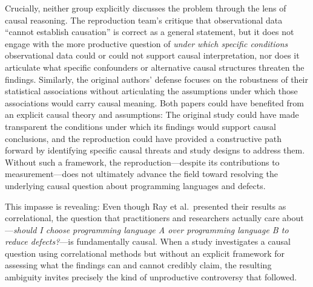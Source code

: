 Crucially, neither group explicitly discusses the problem through the lens of causal reasoning.
The reproduction team's critique that observational data ``cannot establish causation'' is correct as a general statement, but it does not engage with the more productive question of \emph{under which specific conditions} observational data could or could not support causal interpretation, nor does it articulate what specific confounders or alternative causal structures threaten the findings.
Similarly, the original authors' defense focuses on the robustness of their statistical associations without articulating the assumptions under which those associations would carry causal meaning.
Both papers could have benefited from an explicit causal theory and assumptions: The original study could have made transparent the conditions under which its findings would support causal conclusions, and the reproduction could have provided a constructive path forward by identifying specific causal threats and study designs to address them.
Without such a framework, the reproduction---despite its contributions to measurement---does not ultimately advance the field toward resolving the underlying causal question about programming languages and defects.

This impasse is revealing: Even though Ray et al.\ presented their results as correlational, the question that practitioners and researchers actually care about---\emph{should I choose programming language A over programming language B to reduce defects?}---is fundamentally causal.
When a study investigates a causal question using correlational methods but without an explicit framework for assessing what the findings can and cannot credibly claim, the resulting ambiguity invites precisely the kind of unproductive controversy that followed.

